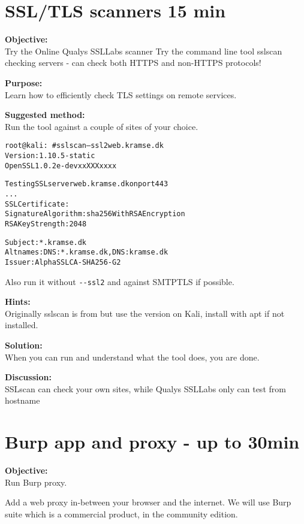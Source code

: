 \documentclass[a4paper,11pt,notitlepage]{report}
\begin{document}
\chapter{SSL/TLS scanners 15 min}
\label{ex:SSLScanner}

{\bf Objective:}\\
Try the Online Qualys SSLLabs scanner 
Try the command line tool sslscan checking servers - can check both HTTPS and non-HTTPS protocols!

{\bf Purpose:}\\
Learn how to efficiently check TLS settings on remote services.

{\bf Suggested method:}\\
Run the tool against a couple of sites of your choice.

\begin{alltt}\small
root@kali:~# sslscan --ssl2 web.kramse.dk
Version: 1.10.5-static
OpenSSL 1.0.2e-dev xx XXX xxxx

Testing SSL server web.kramse.dk on port 443
...
  SSL Certificate:
Signature Algorithm: sha256WithRSAEncryption
RSA Key Strength:    2048

Subject:  *.kramse.dk
Altnames: DNS:*.kramse.dk, DNS:kramse.dk
Issuer:   AlphaSSL CA - SHA256 - G2
\end{alltt}

Also run it without \verb+--ssl2+ and against SMTPTLS if possible.

{\bf Hints:}\\
Originally sslscan is from  but use the version on Kali, install with apt if not installed.

{\bf Solution:}\\
When you can run and understand what the tool does, you are done.

{\bf Discussion:}\\
SSLscan can check your own sites, while Qualys SSLLabs only can test from hostname



\chapter{Burp app and proxy - up to 30min}
\label{ex:burp-basic}

{\bf Objective:}\\
Run Burp proxy.

Add a web proxy in-between your browser and the internet. We will use Burp suite which is a commercial product, in the community edition.
\end{document}
